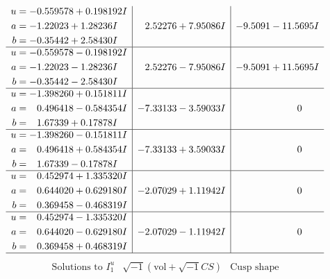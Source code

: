 \documentclass[1p]{elsarticle_modified}
\theoremstyle{definition}
\newcommand{\I}{\sqrt{-1}}
\begin{document}
$$\begin{array}{c|c|c}
\begin{aligned}
u &= -0.559578 + 0.198192 I \\
a &= -1.22023 + 1.28236 I \\
b &= -0.35442 + 2.58430 I\end{aligned}
 & \phantom{-}2.52276 + 7.95086 I & -9.5091 - 11.5695 I \\ \hline\begin{aligned}
u &= -0.559578 - 0.198192 I \\
a &= -1.22023 - 1.28236 I \\
b &= -0.35442 - 2.58430 I\end{aligned}
 & \phantom{-}2.52276 - 7.95086 I & -9.5091 + 11.5695 I \\ \hline\begin{aligned}
u &= -1.398260 + 0.151811 I \\
a &= \phantom{-}0.496418 - 0.584354 I \\
b &= \phantom{-}1.67339 + 0.17878 I\end{aligned}
 & -7.33133 - 3.59033 I & \phantom{-0.000000 } 0 \\ \hline\begin{aligned}
u &= -1.398260 - 0.151811 I \\
a &= \phantom{-}0.496418 + 0.584354 I \\
b &= \phantom{-}1.67339 - 0.17878 I\end{aligned}
 & -7.33133 + 3.59033 I & \phantom{-0.000000 } 0 \\ \hline\begin{aligned}
u &= \phantom{-}0.452974 + 1.335320 I \\
a &= \phantom{-}0.644020 + 0.629180 I \\
b &= \phantom{-}0.369458 - 0.468319 I\end{aligned}
 & -2.07029 + 1.11942 I & \phantom{-0.000000 } 0 \\ \hline\begin{aligned}
u &= \phantom{-}0.452974 - 1.335320 I \\
a &= \phantom{-}0.644020 - 0.629180 I \\
b &= \phantom{-}0.369458 + 0.468319 I\end{aligned}
 & -2.07029 - 1.11942 I & \phantom{-0.000000 } 0\\
 \hline 
 \end{array}$$\newpage$$\begin{array}{c|c|c}  
\text{Solutions to }I^u_{1}& \I (\text{vol} + \sqrt{-1}CS) & \text{Cusp shape}\\
 \hline 
\begin{aligned}

\end{aligned}
\end{array}$$
\end{document}
